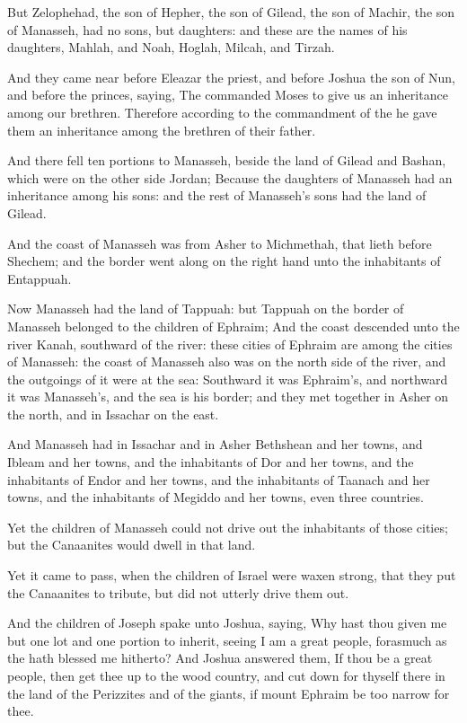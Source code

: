 \verse But Zelophehad, the son of Hepher, the son of Gilead, the son of Machir, the son of Manasseh, had no sons, but daughters: and these are the names of his daughters, Mahlah, and Noah, Hoglah, Milcah, and Tirzah.

\verse And they came near before Eleazar the priest, and before Joshua the son of Nun, and before the princes, saying, The \LORD commanded Moses to give us an inheritance among our brethren. Therefore according to the commandment of the \LORD he gave them an inheritance among the brethren of their father.

\verse And there fell ten portions to Manasseh, beside the land of Gilead and Bashan, which were on the other side Jordan; \verse Because the daughters of Manasseh had an inheritance among his sons: and the rest of Manasseh's sons had the land of Gilead.

\verse And the coast of Manasseh was from Asher to Michmethah, that lieth before Shechem; and the border went along on the right hand unto the inhabitants of Entappuah.

\verse Now Manasseh had the land of Tappuah: but Tappuah on the border of Manasseh belonged to the children of Ephraim; \verse And the coast descended unto the river Kanah, southward of the river: these cities of Ephraim are among the cities of Manasseh: the coast of Manasseh also was on the north side of the river, and the outgoings of it were at the sea: \verse Southward it was Ephraim's, and northward it was Manasseh's, and the sea is his border; and they met together in Asher on the north, and in Issachar on the east.

\verse And Manasseh had in Issachar and in Asher Bethshean and her towns, and Ibleam and her towns, and the inhabitants of Dor and her towns, and the inhabitants of Endor and her towns, and the inhabitants of Taanach and her towns, and the inhabitants of Megiddo and her towns, even three countries.

\verse Yet the children of Manasseh could not drive out the inhabitants of those cities; but the Canaanites would dwell in that land.

\verse Yet it came to pass, when the children of Israel were waxen strong, that they put the Canaanites to tribute, but did not utterly drive them out.

\verse And the children of Joseph spake unto Joshua, saying, Why hast thou given me but one lot and one portion to inherit, seeing I am a great people, forasmuch as the \LORD hath blessed me hitherto?  \verse And Joshua answered them, If thou be a great people, then get thee up to the wood country, and cut down for thyself there in the land of the Perizzites and of the giants, if mount Ephraim be too narrow for thee.

